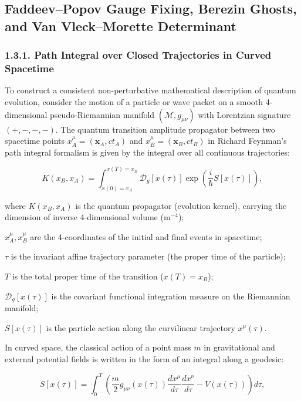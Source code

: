 \documentclass[11pt,a4paper]{article}
\theoremstyle{definition}
\begin{document}
\subsection{Faddeev--Popov Gauge Fixing, Berezin Ghosts, and Van Vleck--Morette Determinant}\label{sec:1.3}

\subsubsection{1.3.1. Path Integral over Closed Trajectories in Curved Spacetime}\label{sec:1.3.1}

To construct a consistent non-perturbative mathematical description of quantum evolution, consider the motion of a particle or wave packet on a smooth 4-dimensional pseudo-Riemannian manifold $(\mathcal{M}, g_{\mu\nu})$ with Lorentzian signature $(+,-,-,-)$. The quantum transition amplitude propagator between two spacetime points $x_A^\mu = (\mathbf{x}_A, ct_A)$ and $x_B^\mu = (\mathbf{x}_B, ct_B)$ in Richard Feynman's path integral formalism is given by the integral over all continuous trajectories:

\begin{equation}\label{eq:1.33}\tag{1.33}
K(x_B, x_A) = \int_{x(0)=x_A}^{x(T)=x_B} \mathcal{D}_g[x(\tau)] \exp\left( \frac{i}{\hbar} S[x(\tau)] \right),
\end{equation}

where $K(x_B, x_A)$ is the quantum propagator (evolution kernel), carrying the dimension of inverse 4-dimensional volume ($\text{m}^{-4}$);  

$x_A^\mu, x_B^\mu$ are the 4-coordinates of the initial and final events in spacetime;  

$\tau$ is the invariant affine trajectory parameter (the proper time of the particle);  

$T$ is the total proper time of the transition ($x(T) = x_B$);  

$\mathcal{D}_g[x(\tau)]$ is the covariant functional integration measure on the Riemannian manifold;  

$S[x(\tau)]$ is the particle action along the curvilinear trajectory $x^\mu(\tau)$.

In curved space, the classical action of a point mass $m$ in gravitational and external potential fields is written in the form of an integral along a geodesic:

\begin{equation}\label{eq:1.34}\tag{1.34}
S[x(\tau)] = \int_0^T \left( \frac{m}{2} g_{\mu\nu}(x(\tau)) \frac{dx^\mu}{d\tau} \frac{dx^\nu}{d\tau} - V(x(\tau)) \right) d\tau,
\end{equation}
\end{document}
